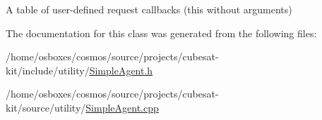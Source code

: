 A table of user-\/defined request callbacks (this without arguments) 



The documentation for this class was generated from the following files\+:\begin{DoxyCompactItemize}
\item 
/home/osboxes/cosmos/source/projects/cubesat-\/kit/include/utility/\hyperlink{SimpleAgent_8h}{Simple\+Agent.\+h}\item 
/home/osboxes/cosmos/source/projects/cubesat-\/kit/source/utility/\hyperlink{SimpleAgent_8cpp}{Simple\+Agent.\+cpp}\end{DoxyCompactItemize}
